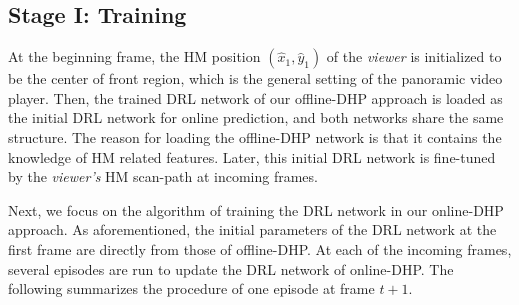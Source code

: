 \documentclass[10pt,journal,compsoc]{IEEEtran}
\begin{document}
\subsection{Stage I: Training}
At the beginning frame, the HM position $(\hat{x}_1,\hat{y}_1)$ of the \textit{viewer} is initialized to be the center of front region, which is the general setting of  the panoramic video player. Then, the trained DRL network of our offline-DHP approach is loaded as the initial DRL network for online prediction, and both networks share the same structure.
The reason for loading the offline-DHP network is that it contains the knowledge of HM related features.
Later, this initial DRL network is fine-tuned by the \textit{viewer's} HM scan-path at incoming frames.

Next, we focus on the algorithm of training the DRL network in our online-DHP approach. As aforementioned, the initial parameters of the DRL network at the first frame are directly from those of offline-DHP. At each of the incoming frames, several episodes are run to update the DRL network of online-DHP. The following summarizes the procedure of one episode at frame $t+1$.
\end{document}
